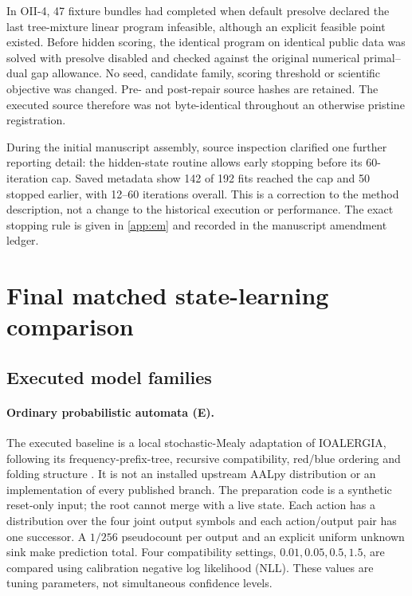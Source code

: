 In OII-4, 47 fixture bundles had completed when default presolve declared the last tree-mixture linear program infeasible, although an explicit feasible point existed. Before hidden scoring, the identical program on identical public data was solved with presolve disabled and checked against the original numerical primal--dual gap allowance. No seed, candidate family, scoring threshold or scientific objective was changed. Pre- and post-repair source hashes are retained. The executed source therefore was not byte-identical throughout an otherwise pristine registration.

During the initial manuscript assembly, source inspection clarified one further reporting detail: the hidden-state routine allows early stopping before its 60-iteration cap. Saved metadata show 142 of 192 fits reached the cap and 50 stopped earlier, with 12--60 iterations overall. This is a correction to the method description, not a change to the historical execution or performance. The exact stopping rule is given in \cref{app:em} and recorded in the manuscript amendment ledger.



\section{Final matched state-learning comparison}\label{sec:final}
\subsection{Executed model families}\label{sec:methods-final}
\paragraph{Ordinary probabilistic automata (E).}
The executed baseline is a local stochastic-Mealy adaptation of IOALERGIA, following its frequency-prefix-tree, recursive compatibility, red/blue ordering and folding structure \cite{Mao2012MDP,AALpySource}. It is not an installed upstream AALpy distribution or an implementation of every published branch. The preparation code is a synthetic reset-only input; the root cannot merge with a live state. Each action has a distribution over the four joint output symbols and each action/output pair has one successor. A $1/256$ pseudocount per output and an explicit uniform unknown sink make prediction total. Four compatibility settings, $0.01,0.05,0.5,1.5$, are compared using calibration negative log likelihood (NLL). These values are tuning parameters, not simultaneous confidence levels.

